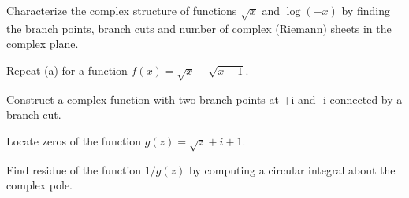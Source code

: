 
\be
\item Characterize the complex structure of functions $\sqrt{x}$ and $\log(-x)$ by finding the branch points,
branch cuts and number of complex (Riemann) sheets in the complex plane.
\item Repeat (a) for a function $f(x) = \sqrt{x} - \sqrt{x-1}$.
\item Construct a complex function with two branch points at +i and -i connected by a branch cut.
\item Locate zeros of the function $g(z) = \sqrt{z}+i+1$.
\item Find residue of the function $1/g(z)$ by computing a circular integral about the complex pole.
\ee